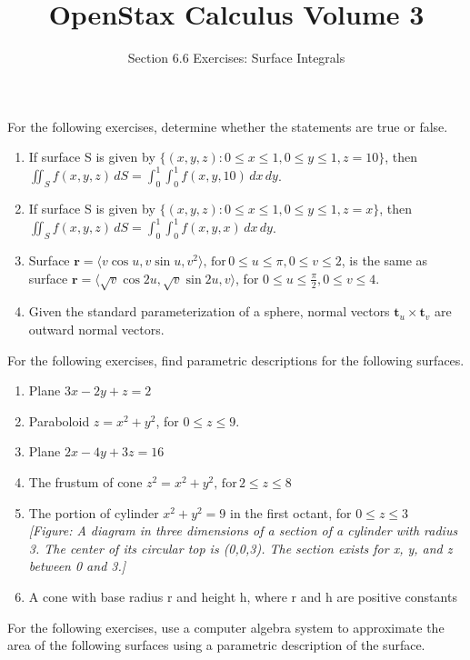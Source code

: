 \documentclass{exercises}
\title{OpenStax Calculus Volume 3}
\subtitle{Section 6.6 Exercises: Surface Integrals}
\author{}
\date{}
\begin{document}
\maketitle


For the following exercises, determine whether the statements are true or false.

\begin{enumerate}[start=1]
\item If surface S is given by $\{(x,y,z):0\le x\le1,0\le y\le1,z=10\}$, then $\iint_{S}f(x,y,z)\,dS=\int_{0}^{1}\int_{0}^{1}f(x,y,10)\,dx\,dy$.
\item If surface S is given by $\{(x,y,z):0\le x\le1,0\le y\le1,z=x\}$, then $\iint_{S}f(x,y,z)\,dS=\int_{0}^{1}\int_{0}^{1}f(x,y,x)\,dx\,dy$.
\item Surface $\mathbf{r}=\langle v\cos u,v\sin u,v^{2}\rangle,\,\text{for}\,0\le u\le \pi,0\le v\le2$, is the same as surface $\mathbf{r}=\langle \sqrt{v}\cos 2u,\sqrt{v}\sin 2u,v\rangle$, for $0\le u\le \frac{\pi}{2},0\le v\le4$.
\item Given the standard parameterization of a sphere, normal vectors $\mathbf{t}_{u}\times \mathbf{t}_{v}$ are outward normal vectors.
\end{enumerate}

For the following exercises, find parametric descriptions for the following surfaces.

\begin{enumerate}[resume]
\item Plane $3x-2y+z=2$
\item Paraboloid $z=x^{2}+y^{2}$, for $0\le z\le9$.
\item Plane $2x-4y+3z=16$
\item The frustum of cone $z^{2}=x^{2}+y^{2},\,\text{for}\,2\le z\le8$
\item The portion of cylinder $x^{2}+y^{2}=9$ in the first octant, for $0\le z\le3$ \\ \textit{[Figure: A diagram in three dimensions of a section of a cylinder with radius 3. The center of its circular top is (0,0,3). The section exists for x, y, and z between 0 and 3.]}
\item A cone with base radius r and height h, where r and h are positive constants
\end{enumerate}

For the following exercises, use a computer algebra system to approximate the area of the following surfaces using a parametric description of the surface.
\end{document}
